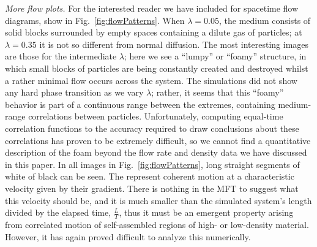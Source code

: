 \documentclass[
reprint,
 amsmath,amssymb,
 aps,
 prl,
]{revtex4-1}
\begin{document}
\textit{More flow plots.} For the interested reader we have included for spacetime flow diagrams, show in Fig.~\ref{fig:flowPatterns}. When $\lambda=0.05$, the medium consists of solid blocks surrounded by empty spaces containing a dilute
gas of particles; at $\lambda=0.35$ it is not so different from normal diffusion.
The most interesting images are those for the intermediate $\lambda$; here we see a ``lumpy'' or ``foamy'' structure, in which small blocks
of particles are being constantly created and destroyed whilst a rather minimal flow occurs across the system.
The simulations did not show any hard phase transition as we vary $\lambda$; rather, it seems that this ``foamy''
behavior is part of a continuous range between the extremes, containing medium-range correlations between particles.
Unfortunately, computing equal-time correlation functions to the accuracy required
to draw conclusions about these correlations has proven to be extremely difficult, so we cannot find a quantitative description of the foam beyond the flow rate and density data we have discussed in this paper.
In all images in Fig.~\ref{fig:flowPatterns}, long straight segments of white of black can be seen.  The represent coherent motion at a characteristic velocity given by their gradient. There is nothing in the MFT to suggest what this velocity
should be, and it is much smaller than the simulated system's length divided by the elapsed time,  $\frac{L}{T}$, thus it must be an emergent property arising from correlated motion of self-assembled regions of  high- or low-density material.
However, it has again proved difficult to analyze this numerically.
\end{document}
